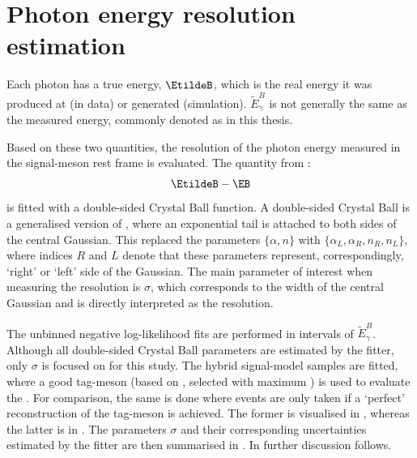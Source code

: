 \chapter{Photon energy resolution estimation}\label{sec:appendix_resolution_fits}

Each photon has a true energy, $\EtildeB$, which is the real energy it was produced at (in data) or generated (simulation).
$\tilde{E}_{\gamma}^B$ is not generally the same as the measured energy, commonly denoted as \EB in this thesis.

Based on these two quantities, the resolution of the photon energy measured in the signal-\B meson rest frame is evaluated.
The quantity from :
\begin{equation}
    \EtildeB - \EB
\end{equation}
is fitted with a double-sided Crystal Ball function.
A double-sided Crystal Ball is a generalised version of , where an exponential tail is attached to both sides of the central Gaussian.
This replaced the parameters $\{\alpha,n\}$ with $\{\alpha_L,\alpha_R, n_R, n_L\}$, where indices $R$ and $L$ denote that these parameters represent, correspondingly, `right' or `left' side of the Gaussian.
The main parameter of interest when measuring the resolution is $\sigma$, which corresponds to the width of the central Gaussian and is directly interpreted as the resolution.

The unbinned negative log-likelihood fits are performed in intervals of $\tilde{E}_{\gamma}^B$.
Although all double-sided Crystal Ball parameters are estimated by the fitter, only $\sigma$ is focused on for this study.
The hybrid signal-model samples are fitted, where a good tag-\B meson (based on , selected with maximum \feiProb) is used to evaluate the \EB.
For comparison, the same is done where events are only taken if a `perfect' reconstruction of the tag-\B meson is achieved.
The former is visualised in , whereas the latter is in .
The parameters $\sigma$ and their corresponding uncertainties estimated by the fitter are then summarised in .
In  further discussion follows.

